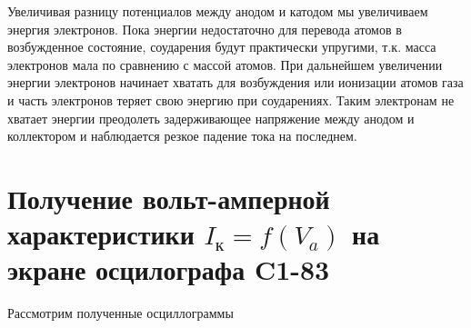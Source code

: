 \documentclass[12pt]{article}
\begin{document}
  Увеличивая разницу потенциалов между анодом и катодом мы увеличиваем энергия электронов.
  Пока энергии недостаточно для перевода атомов в возбужденное состояние, соударения будут практически
  упругими, т.к. масса электронов мала по сравнению с массой атомов. При дальнейшем увеличении энергии
  электронов начинает хватать для возбуждения или ионизации атомов газа и часть электронов теряет свою энергию
  при соударениях. Таким электронам не хватает энергии преодолеть задерживающее напряжение между анодом и
  коллектором и наблюдается резкое падение тока на последнем.

\section{Получение вольт-амперной характеристики $I_к = f(V_a)$ на экране осцилографа C1-83}

  Рассмотрим полученные осциллограммы
\end{document}
